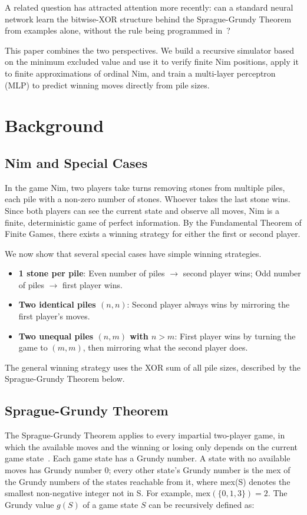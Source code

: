 \documentclass[11pt]{article}
\begin{document}
A related question has attracted attention more recently: can a standard neural network learn the bitwise-XOR structure behind the Sprague-Grundy Theorem from examples alone, without the rule being programmed in~\cite{shalev2017failures, riis2024mastering}? 

This paper combines the two perspectives. We build a recursive simulator based on the minimum excluded value and use it to verify finite Nim positions, apply it to finite approximations of ordinal Nim, and train a multi-layer perceptron (MLP) to predict winning moves directly from pile sizes.


\section{Background}
\subsection{Nim and Special Cases}
In the game Nim, two players take turns removing stones from multiple piles, each pile with a non-zero number of stones. Whoever takes the last stone wins. Since both players can see the current state and observe all moves, Nim is a finite, deterministic game of perfect information. By the Fundamental Theorem of Finite Games, there exists a winning strategy for either the first or second player. 

We now show that several special cases have simple winning strategies. 
\begin{itemize}
    \item \textbf{1 stone per pile}: Even number of piles $\xrightarrow{}$ second player wins; Odd number of piles $\xrightarrow{}$ first player wins. 
    \item \textbf{Two identical piles $(n,n)$}: Second player always wins by mirroring the first player's moves. 
    \item \textbf{Two unequal piles $(n,m)$ with $n>m$}: First player wins by turning the game to $(m,m)$, then mirroring what the second player does. 
\end{itemize}

The general winning strategy uses the XOR sum of all pile sizes, described by the Sprague-Grundy Theorem below. 

\subsection{Sprague-Grundy Theorem}
The Sprague-Grundy Theorem applies to every impartial two-player game, in which the available moves and the winning or losing only depends on the current game state~\cite{cpalgorithms2024nim}. Each game state has a Grundy number. A state with no available moves has Grundy number 0; every other state's Grundy number is the mex of the Grundy numbers of the states reachable from it, where mex(S) denotes the smallest non-negative integer not in S. For example, $\text{mex}(\{0,1,3\})=2$. The Grundy value $g(S)$ of a game state $S$ can be recursively defined as:
\end{document}
